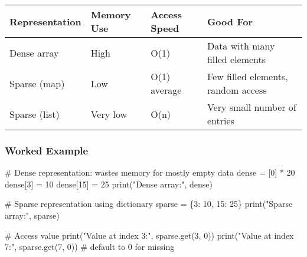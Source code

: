 \documentclass[
  letterpaper,
  DIV=11,
  numbers=noendperiod]{scrreprt}
\newenvironment{Shaded}{\begin{snugshade}}{\end{snugshade}}
\newcommand{\BuiltInTok}[1]{\textcolor[rgb]{0.00,0.23,0.31}{#1}}
\newcommand{\CommentTok}[1]{\textcolor[rgb]{0.37,0.37,0.37}{#1}}
\newcommand{\DecValTok}[1]{\textcolor[rgb]{0.68,0.00,0.00}{#1}}
\newcommand{\NormalTok}[1]{\textcolor[rgb]{0.00,0.23,0.31}{#1}}
\newcommand{\OperatorTok}[1]{\textcolor[rgb]{0.37,0.37,0.37}{#1}}
\newcommand{\StringTok}[1]{\textcolor[rgb]{0.13,0.47,0.30}{#1}}
\begin{document}
\begin{longtable}[]{@{}
  >{\raggedright\arraybackslash}p{}
  >{\raggedright\arraybackslash}p{}
  >{\raggedright\arraybackslash}p{}
  >{\raggedright\arraybackslash}p{}@{}}
\toprule\noalign{}
\begin{minipage}[b]{\linewidth}\raggedright
Representation
\end{minipage} & \begin{minipage}[b]{\linewidth}\raggedright
Memory Use
\end{minipage} & \begin{minipage}[b]{\linewidth}\raggedright
Access Speed
\end{minipage} & \begin{minipage}[b]{\linewidth}\raggedright
Good For
\end{minipage} \\
\midrule\noalign{}
\endhead
\bottomrule\noalign{}
\endlastfoot
Dense array & High & O(1) & Data with many filled elements \\
Sparse (map) & Low & O(1) average & Few filled elements, random
access \\
Sparse (list) & Very low & O(n) & Very small number of entries \\
\end{longtable}

\subsubsection{Worked Example}\label{worked-example-8}

\begin{Shaded}
\begin{Highlighting}[]
\CommentTok{\# Dense representation: wastes memory for mostly empty data}
\NormalTok{dense }\OperatorTok{=}\NormalTok{ [}\DecValTok{0}\NormalTok{] }\OperatorTok{*} \DecValTok{20}
\NormalTok{dense[}\DecValTok{3}\NormalTok{] }\OperatorTok{=} \DecValTok{10}
\NormalTok{dense[}\DecValTok{15}\NormalTok{] }\OperatorTok{=} \DecValTok{25}
\BuiltInTok{print}\NormalTok{(}\StringTok{"Dense array:"}\NormalTok{, dense)}

\CommentTok{\# Sparse representation using dictionary}
\NormalTok{sparse }\OperatorTok{=}\NormalTok{ \{}\DecValTok{3}\NormalTok{: }\DecValTok{10}\NormalTok{, }\DecValTok{15}\NormalTok{: }\DecValTok{25}\NormalTok{\}}
\BuiltInTok{print}\NormalTok{(}\StringTok{"Sparse array:"}\NormalTok{, sparse)}

\CommentTok{\# Access value}
\BuiltInTok{print}\NormalTok{(}\StringTok{"Value at index 3:"}\NormalTok{, sparse.get(}\DecValTok{3}\NormalTok{, }\DecValTok{0}\NormalTok{))}
\BuiltInTok{print}\NormalTok{(}\StringTok{"Value at index 7:"}\NormalTok{, sparse.get(}\DecValTok{7}\NormalTok{, }\DecValTok{0}\NormalTok{))  }\CommentTok{\# default to 0 for missing}
\end{Highlighting}
\end{Shaded}
\end{document}
